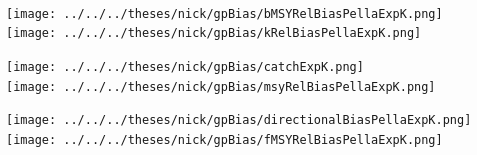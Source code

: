 \documentclass[ xcolor = pdftex, dvipsnames, table ]{beamer}
\begin{document}
{%
\begin{frame}%
$~$
\hspace*{-1.25cm}
\begin{minipage}[h!]{0.33\textwidth}
\hspace*{0.25cm}
\texttt{[image: ../../../theses/nick/gpBias/bMSYRelBiasPellaExpK.png]}\\
\hspace*{0.25cm}
\texttt{[image: ../../../theses/nick/gpBias/kRelBiasPellaExpK.png]}
\end{minipage}
\begin{minipage}[h!]{0.33\textwidth}
\hspace*{0.75cm}
\texttt{[image: ../../../theses/nick/gpBias/catchExpK.png]}\\
\hspace*{0.75cm}
\texttt{[image: ../../../theses/nick/gpBias/msyRelBiasPellaExpK.png]}
\end{minipage}
\begin{minipage}[h!]{0.33\textwidth}
\hspace*{1cm}
\texttt{[image: ../../../theses/nick/gpBias/directionalBiasPellaExpK.png]}\\
\hspace*{1cm}
\texttt{[image: ../../../theses/nick/gpBias/fMSYRelBiasPellaExpK.png]}
\end{minipage}
\end{frame}

}
\end{document}
